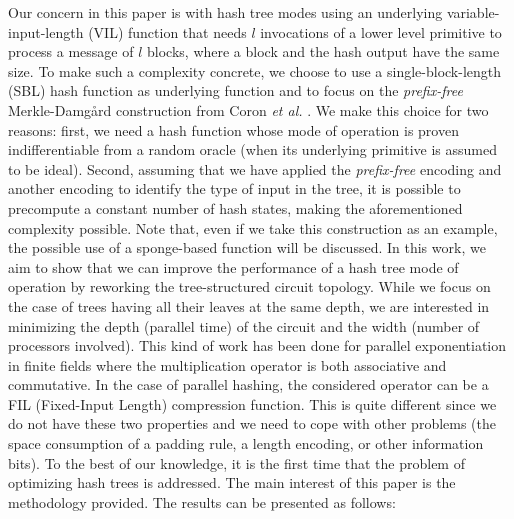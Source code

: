 \documentclass{llncs}
\begin{document}
Our concern in this paper is with hash tree modes using an underlying variable-input-length (VIL)
function that needs $l$ invocations of a lower level primitive to process a message of $l$ blocks, 
where a block and the hash output have the same size.
To make such a complexity concrete,
we choose to use a single-block-length (SBL) hash function as underlying function 
and to focus on the \emph{prefix-free} Merkle-Damg{\aa}rd construction from Coron \textit{et al.} \cite{CDMP05}. We make this choice for two reasons: 
first, we need a hash function whose mode of operation is proven indifferentiable from a random oracle (when its underlying primitive is assumed to be ideal).
Second, assuming that we have applied the \emph{prefix-free} encoding \cite{CDMP05} 
and another encoding \cite{BDPV09,BDPV14_Sak} to identify the type of input in the tree, it is possible to precompute a constant number of hash states,
making the aforementioned complexity possible.
Note that, even if we take this construction as an example, the possible use of a sponge-based function 
will be discussed.
In this work, we aim to show that we can improve
the performance of a hash tree mode of operation by reworking the tree-structured circuit topology.
While we focus on the case of trees having all their leaves at the same depth,
we are interested in minimizing the depth (parallel time)
of the circuit and the width (number of processors involved). This kind of work has been done for parallel 
exponentiation in finite fields \cite{Sti90,Gat91,AMV88a,LKPC05,WLLC06} where the multiplication operator is both associative and commutative.
In the case of parallel hashing, the considered operator can be a FIL (Fixed-Input Length) compression function. This is quite different since 
we do not have these two properties and we need to cope with other problems (the space consumption of a padding rule, a length encoding, 
or other information bits).
To the best of our knowledge, it is the first time that the problem of optimizing hash trees is addressed. The main interest of this paper is 
the methodology provided.
The results can be presented as follows:
\end{document}
